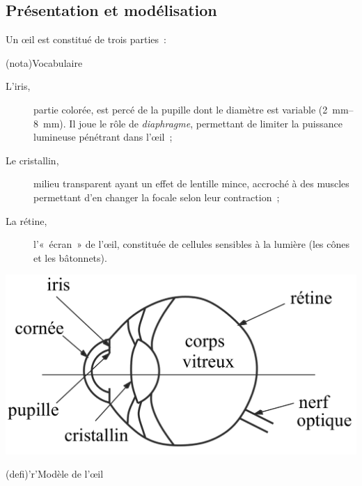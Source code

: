 \documentclass[../../main/main.tex]{subfiles}
\begin{document}
\subsection{Présentation et modélisation}
Un œil est constitué de trois parties~:\smallbreak
\begin{tcbraster}[raster columns=2, raster equal height=rows]
	\begin{tcb}[label=nota:oeilvoca](nota){Vocabulaire}
		\begin{description}
			\item[L'iris,] partie colorée, est percé de la pupille dont le diamètre est
				variable (\SIrange{2}{8}{mm}). Il joue le rôle de \textit{diaphragme},
				permettant de limiter la puissance lumineuse pénétrant dans
				l'œil~;
			\item[Le cristallin,] milieu transparent ayant un effet de lentille mince,
				accroché à des muscles permettant d'en changer la focale selon leur
				contraction~;
			\item[La rétine,] l'«~écran~» de l'œil, constituée de cellules sensibles à
				la lumière (les cônes et les bâtonnets).
		\end{description}
		\begin{center}
			\includegraphics[width=\linewidth]{oeil_coupe}
			\label{fig:oeil_coupe}
		\end{center}
	\end{tcb}
	\begin{tcb}[label=def:oeil](defi)'r'{Modèle de l'œil}


\end{tcb}
\end{tcbraster}
\end{document}
